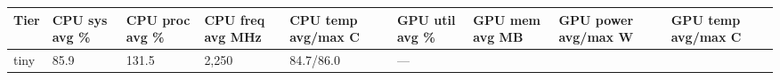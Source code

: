 \documentclass[
  9pt, a4paper, landscape]{article}
\begin{document}
\begin{longtable}[]{@{}lllllllll@{}}
\toprule
\begin{minipage}[b]{0.08\columnwidth}\raggedright
Tier\strut
\end{minipage} & \begin{minipage}[b]{0.08\columnwidth}\raggedright
CPU sys avg \%\strut
\end{minipage} & \begin{minipage}[b]{0.08\columnwidth}\raggedright
CPU proc avg \%\strut
\end{minipage} & \begin{minipage}[b]{0.08\columnwidth}\raggedright
CPU freq avg MHz\strut
\end{minipage} & \begin{minipage}[b]{0.08\columnwidth}\raggedright
CPU temp avg/max C\strut
\end{minipage} & \begin{minipage}[b]{0.08\columnwidth}\raggedright
GPU util avg \%\strut
\end{minipage} & \begin{minipage}[b]{0.08\columnwidth}\raggedright
GPU mem avg MB\strut
\end{minipage} & \begin{minipage}[b]{0.08\columnwidth}\raggedright
GPU power avg/max W\strut
\end{minipage} & \begin{minipage}[b]{0.08\columnwidth}\raggedright
GPU temp avg/max C\strut
\end{minipage}\tabularnewline
\midrule
\endhead
\begin{minipage}[t]{0.08\columnwidth}\raggedright
tiny\strut
\end{minipage} & \begin{minipage}[t]{0.08\columnwidth}\raggedright
85.9\strut
\end{minipage} & \begin{minipage}[t]{0.08\columnwidth}\raggedright
131.5\strut
\end{minipage} & \begin{minipage}[t]{0.08\columnwidth}\raggedright
2,250\strut
\end{minipage} & \begin{minipage}[t]{0.08\columnwidth}\raggedright
84.7/86.0\strut
\end{minipage} & \begin{minipage}[t]{0.08\columnwidth}\raggedright
---\strut
\end{minipage} & \begin{minipage}[t]{0.08\columnwidth}\raggedright

\end{minipage}
\end{longtable}
\end{document}
